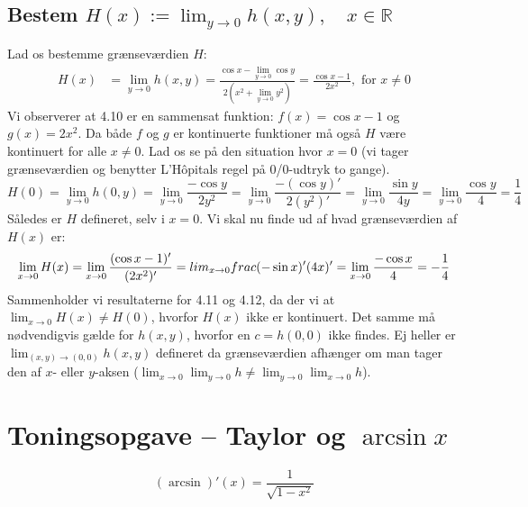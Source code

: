 \documentclass{report}
\begin{document}
\subsection*{Bestem $H(x):=\lim_{y\to0}h(x,y),\quad x\in\mathbb{R}$}
Lad os bestemme grænseværdien $H$:
\begin{align}
    H(x)&=\lim_{y\to0}h(x,y)=\frac{\cos{x}-\lim_{y\to0}\cos{y}}{2(x^2+\lim_{y\to0}y^2)}=\frac{\cos{x}-1}{2x^2},\text{ for }x\neq0
\end{align}
Vi observerer at 4.10 er en sammensat funktion: $f(x)=\cos{x}-1$ og $g(x)=2x^2$. Da både $f$ og $g$ er kontinuerte funktioner må også $H$ være kontinuert for alle $x\neq0$. Lad os se på den situation hvor $x=0$ (vi tager grænseværdien og benytter L'Hôpitals regel på 0/0-udtryk to gange).
\begin{equation}
    H(0)=\lim_{y\to0}h(0,y)=\lim_{y\to0}\frac{-\cos{y}}{2y^2}=\lim_{y\to0}\frac{-(\cos{y})'}{2(y^2)'}=\lim_{y\to0}\frac{\sin{y}}{4y}=\lim_{y\to0}\frac{\cos{y}}{4}=\frac{1}{4}
\end{equation}
Således er $H$ defineret, selv i $x=0$. Vi skal nu finde ud af hvad grænseværdien af $H(x)$ er:\begin{equation}
    \lim_{x\to0}H(x)=\lim_{x\to0}\frac{(\cos{x}-1)'}{(2x^2)'}=\\lim_{x\to0}frac{(-\sin{x})'}{(4x)'}=\lim_{x\to0}\frac{-\cos{x}}{4}=-\frac{1}{4}
\end{equation}
Sammenholder vi resultaterne for 4.11 og 4.12, da der vi at $\lim_{x\to0}H(x)\neq H(0)$, hvorfor $H(x)$ ikke er kontinuert. Det samme må nødvendigvis gælde for $h(x,y)$, hvorfor en $c=h(0,0)$ ikke findes. Ej heller er $\lim_{(x,y)\to(0,0)}h(x,y)$ defineret da grænseværdien afhænger om man tager den af $x$- eller $y$-aksen ($\lim_{x\to0}\lim_{y\to0}h\neq\lim_{y\to0}\lim_{x\to0}h$).


\section{Toningsopgave -- Taylor og $\arcsin{x}$}
$$(\arcsin)'(x)=\frac{1}{\sqrt{1-x^2}}$$
\end{document}
